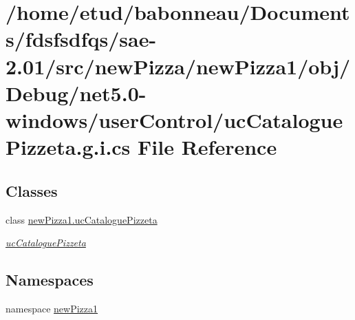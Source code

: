\hypertarget{net5_80-windows_2userControl_2ucCataloguePizzeta_8g_8i_8cs}{}\section{/home/etud/babonneau/\+Documents/fdsfsdfqs/sae-\/2.01/src/new\+Pizza/new\+Pizza1/obj/\+Debug/net5.0-\/windows/user\+Control/uc\+Catalogue\+Pizzeta.g.\+i.\+cs File Reference}
\label{net5_80-windows_2userControl_2ucCataloguePizzeta_8g_8i_8cs}
\subsection*{Classes}
\begin{DoxyCompactItemize}
\item 
class \hyperlink{classnewPizza1_1_1ucCataloguePizzeta}{new\+Pizza1.\+uc\+Catalogue\+Pizzeta}
\begin{DoxyCompactList}\small\item\em \hyperlink{classnewPizza1_1_1ucCataloguePizzeta}{uc\+Catalogue\+Pizzeta} \end{DoxyCompactList}\end{DoxyCompactItemize}
\subsection*{Namespaces}
\begin{DoxyCompactItemize}
\item 
namespace \hyperlink{namespacenewPizza1}{new\+Pizza1}
\end{DoxyCompactItemize}
